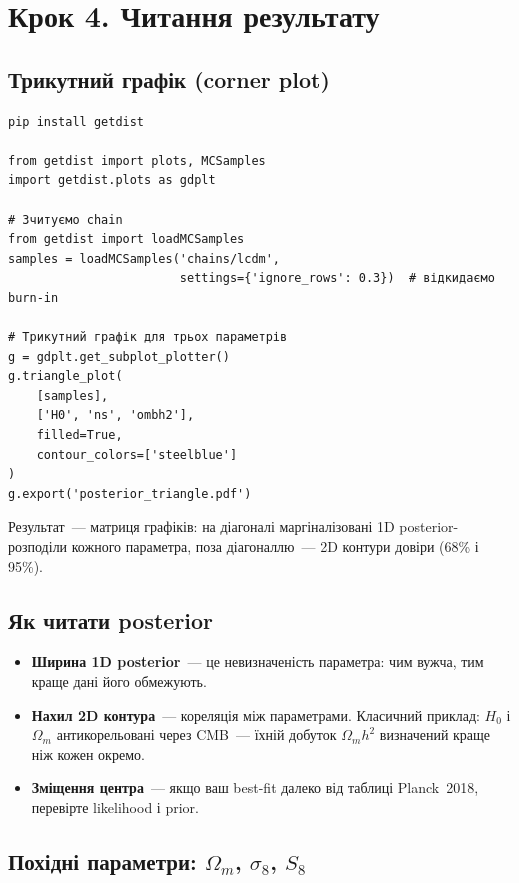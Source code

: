 \section{Крок 4. Читання результату}

\subsection{Трикутний графік (corner plot)}

\begin{verbatim}
pip install getdist

from getdist import plots, MCSamples
import getdist.plots as gdplt

# Зчитуємо chain
from getdist import loadMCSamples
samples = loadMCSamples('chains/lcdm',
                        settings={'ignore_rows': 0.3})  # відкидаємо burn-in

# Трикутний графік для трьох параметрів
g = gdplt.get_subplot_plotter()
g.triangle_plot(
    [samples],
    ['H0', 'ns', 'ombh2'],
    filled=True,
    contour_colors=['steelblue']
)
g.export('posterior_triangle.pdf')
\end{verbatim}

Результат~--- матриця графіків: на діагоналі маргіналізовані
1D posterior-розподіли кожного параметра, поза діагоналлю~---
2D контури довіри (68\% і 95\%).

\subsection{Як читати posterior}

\begin{itemize}
  \item \textbf{Ширина 1D posterior}~--- це невизначеність
        параметра: чим вужча, тим краще дані його обмежують.
  \item \textbf{Нахил 2D контура}~--- кореляція між параметрами.
        Класичний приклад: $H_0$ і $\Omega_m$ антикорельовані
        через CMB~--- їхній добуток $\Omega_m h^2$ визначений
        краще ніж кожен окремо.
  \item \textbf{Зміщення центра}~--- якщо ваш best-fit далеко
        від таблиці Planck~2018, перевірте likelihood і prior.
\end{itemize}

\subsection{Похідні параметри: $\Omega_m$, $\sigma_8$, $S_8$}

